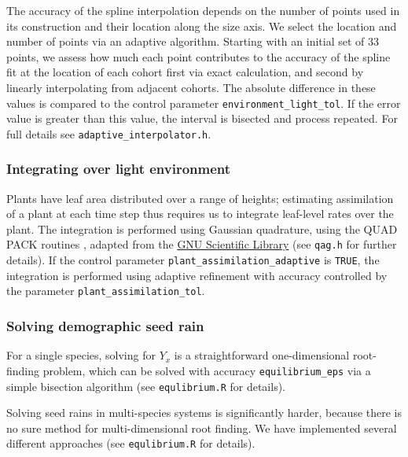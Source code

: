 \documentclass[10pt,twoside]{article}
\begin{document}
The accuracy of the spline interpolation depends on the number of points
used in its construction and their location along the size axis. We
select the location and number of points via an adaptive algorithm.
Starting with an initial set of 33 points, we assess how much each point
contributes to the accuracy of the spline fit at the location of each
cohort first via exact calculation, and second by linearly interpolating
from adjacent cohorts. The absolute difference in these values is
compared to the control parameter \texttt{environment\_light\_tol}. If
the error value is greater than this value, the interval is bisected and
process repeated. For full details see
\texttt{adaptive\_interpolator.h}.

\subsubsection{Integrating over light
environment}\label{integrating-over-light-environment}

Plants have leaf area distributed over a range of heights; estimating
assimilation of a plant at each time step thus requires us to integrate
leaf-level rates over the plant. The integration is performed using
Gaussian quadrature, using the QUAD PACK routines \citep{Piessens-1983},
adapted from the \href{http://www.gnu.org/software/gsl/}{GNU Scientific
Library}\citep{Galassi-2009} (see \texttt{qag.h} for further details).
If the control parameter \texttt{plant\_assimilation\_adaptive} is \texttt{TRUE},
the integration is performed using adaptive refinement with accuracy
controlled by the parameter \texttt{plant\_assimilation\_tol}.

\subsubsection{Solving demographic seed
rain}\label{solving-demographic-seed-rain}

For a single species, solving for \(Y_x\) is a straightforward
one-dimensional root-finding problem, which can be solved with accuracy
\texttt{equilibrium\_eps} via a simple bisection algorithm (see
\texttt{equlibrium.R} for details).

Solving seed rains in multi-species systems is significantly harder,
because there is no sure method for multi-dimensional root finding. We
have implemented several different approaches (see
\texttt{equlibrium.R} for details).

\clearpage
\end{document}
